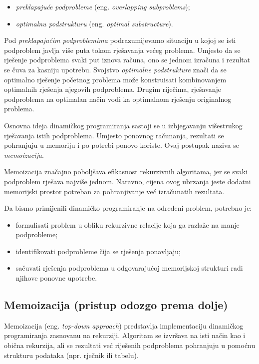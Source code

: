 \begin{itemize}
	\item \textit{preklapajuće podprobleme} (eng. \emph{overlapping subproblems});
	\item \textit{optimalnu podstrukturu} (eng. \emph{optimal substructure}).
\end{itemize}

Pod \textit{preklapajućim podproblemima} podrazumijevamo situaciju u kojoj se isti podproblem javlja više puta tokom rješavanja većeg problema. Umjesto da se rješenje podproblema svaki put iznova računa, ono se  jednom izračuna i rezultat se čuva za kasniju upotrebu. Svojstvo \textit{optimalne podstrukture} znači da se optimalno rješenje početnog problema može konstruisati kombinovanjem optimalnih rješenja njegovih podproblema. Drugim riječima, rješavanje podproblema na optimalan način vodi ka optimalnom rješenju originalnog problema.

Osnovna ideja dinamičkog programiranja sastoji se u izbjegavanju više\-strukog rješavanja istih podproblema. Umjesto ponovnog računanja, rezultati se pohranjuju u memoriju i po potrebi ponovo koriste. Ovaj postupak naziva se \textit{memoizacija}.

Memoizacija značajno poboljšava efikasnost rekurzivnih algoritama, jer se svaki podproblem rješava najviše jednom. Naravno, cijena ovog ubrzanja jeste dodatni memorijski prostor potreban za pohranjivanje već izračunatih rezultata.

\medskip

Da bismo primijenili dinamičko programiranje na određeni problem, potrebno je:

\begin{itemize}
	\item formulisati problem u obliku rekurzivne relacije koja ga razlaže na manje podprobleme;
	\item identifikovati podprobleme čija se rješenja ponavljaju;
	\item sačuvati rješenja podproblema u odgovarajućoj memorijskoj strukturi radi njihove ponovne upotrebe.
\end{itemize}

\subsection{Memoizacija (pristup odozgo prema dolje)}

Memoizacija (eng. \emph{top-down approach}) predstavlja implementaciju dinamičkog programiranja zasnovanu na rekurziji. Algoritam se izvršava na isti način kao i obična rekurzija, ali se rezultati već riješenih podproblema pohranjuju u pomoćnu strukturu podataka (npr. rječnik ili tabelu).

